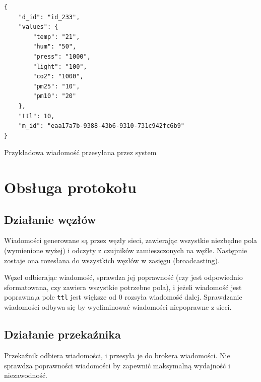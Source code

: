\begin{lstfloat}[b]
    \lstset{language=JavaScript}
    \begin{lstlisting}[frame=single]
{
    "d_id": "id_233",
    "values": {
        "temp": "21",
        "hum": "50",
        "press": "1000",
        "light": "100",
        "co2": "1000",
        "pm25": "10",
        "pm10": "20"
    },
    "ttl": 10,
    "m_id": "eaa17a7b-9388-43b6-9310-731c942fc6b9"
}          
\end{lstlisting}
    \caption{Przykładowa wiadomość przesyłana przez system}\label{lst:packet_format}
\end{lstfloat}

\section{Obsługa protokołu}

\subsection{Działanie węzłów}
Wiadomości generowane są przez węzły sieci, zawierając wszystkie niezbędne pola (wymienione wyżej) i odczyty z czujników zamieszczonych na węźle. Następnie zostaje ona rozesłana do wszystkich węzłów w zasięgu (broadcasting).

Węzeł odbierając wiadomość, sprawdza jej poprawność (czy jest odpowiednio sformatowana, czy zawiera wszystkie potrzebne pola), i jeżeli wiadomość jest poprawna,a pole \texttt{ttl} jest większe od 0 rozsyła wiadomość dalej.
Sprawdzanie wiadomości odbywa się by wyeliminować wiadomości niepoprawne z sieci.


\subsection{Działanie przekaźnika}
Przekaźnik odbiera wiadomości, i przesyła je do brokera wiadomości. Nie sprawdza poprawności wiadomości by zapewnić maksymalną wydajność i niezawodność.

